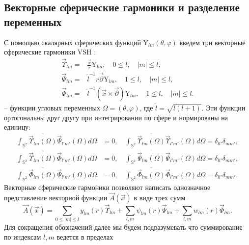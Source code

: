 \documentclass[12pt]{article}
\newcommand{\pl}{\partial}
\newcommand{\Sph}{\mathbb{S}}
\newcommand{\YY}{\mathrm{Y}}
\begin{document}
\subsection{Векторные сферические гармоники и разделение переменных}
    С помощью скалярных сферических функций
$ \YY_{lm}(\theta,\varphi) $
    введем три векторные сферические гармоники VSH
\cite{VSH}:
\begin{align}
\label{VSH1}
    \vec{\Upsilon}_{lm} = & \frac{\vec{x}}{r} \YY_{lm} , \quad
        0 \leq l, \quad |m| \leq l, \\
    \vec{\Psi}_{lm} = & \tilde{l}^{-1} r \vec{\pl} \YY_{lm} , \quad
        1 \leq l , \quad |m| \leq l, \\
\label{VSH3}
    \vec{\Phi}_{lm} = & \tilde{l}^{-1} (\vec{x} \times \vec{\pl}) \YY_{lm},
        \quad 1 \leq l , \quad |m| \leq l .
\end{align}
    -- функции угловых переменных
$ \Omega = (\theta,\varphi) $, где
$ \tilde{l} = \sqrt{l(l+1)} $.
    Эти функции ортогональны друг другу при интегрировании по сфере
    и нормированы на единицу:
\begin{align*}
    \int_{\Sph^{2}} \overline{\vec{\Upsilon}_{lm}(\Omega)}
        \vec{\Psi}_{l'm'}(\Omega) d\Omega & = 0 ,\quad
    \int_{\Sph^{2}} \overline{\vec{\Upsilon}_{lm}(\Omega)}
        \vec{\Upsilon}_{l'm'}(\Omega) d\Omega = \delta_{ll'} \delta_{mm'} , \\
    \int_{\Sph^{2}} \overline{\vec{\Upsilon}_{lm}(\Omega)}
        \vec{\Phi}_{l'm'}(\Omega) d\Omega       & = 0 ,\quad
    \int_{\Sph^{2}} \overline{\vec{\Psi}_{lm}(\Omega)}
        \vec{\Psi}_{l'm'}(\Omega) d\Omega = \delta_{ll'} \delta_{mm'} , \\
    \int_{\Sph^{2}} \overline{\vec{\Phi}_{lm}(\Omega)}
        \vec{\Psi}_{l'm'}(\Omega) d\Omega & = 0 ,\quad
    \int_{\Sph^{2}} \overline{\vec{\Phi}_{lm}(\Omega)}
        \vec{\Phi}_{l'm'}(\Omega) d\Omega = \delta_{ll'} \delta_{mm'} .
\end{align*}
    Векторные сферические гармоники позволяют написать однозначное
    представление векторной функции
$ \vec{A}(\vec{x}) $
    в виде трех сумм
\begin{equation}
\label{fext}
    \vec{A}(\vec{x}) =
        \sum_{0\leq |m| \leq l} y_{lm}(r) \vec{\Upsilon}_{lm} +
        \sum_{l,m} \psi_{lm}(r) \vec{\Psi}_{lm} +
        \sum_{l,m} w_{lm}(r) \vec{\Phi}_{lm} .
\end{equation}
    Для сокращения обозначений далее мы будем подразумевать что суммирование
    по индексам
$ l,m $
    ведется в пределах
\end{document}
